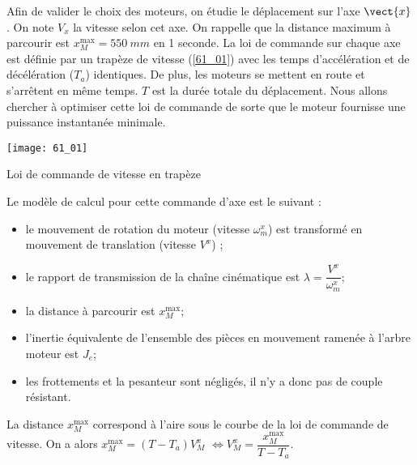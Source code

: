 \normaltrue
\correctionfalse


\setcounter{question}{0}%
\ifcorrection
\else
{}
\fi

\ifprof
\else
Afin de valider le choix des moteurs, on étudie le déplacement sur l’axe $\vect{x}$.%
On note $V_x$ la vitesse selon cet axe.
On rappelle que la distance maximum à parcourir est $x_M^{\text{max}} = \SI{550}{mm}$ en 1 seconde.
La loi de commande sur chaque axe est définie par un trapèze de vitesse (\autoref{61_01})
avec les temps d’accélération et de décélération ($T_a$) identiques. De plus, les moteurs se mettent en route et s’arrêtent en
même temps. $T$ est la durée totale du déplacement. Nous allons chercher à optimiser cette loi de commande de sorte
que le moteur fournisse une puissance instantanée minimale.

\begin{marginfigure}
\centering
\texttt{[image: 61\_01]}
\caption{\label{61_01} Loi de commande de vitesse en trapèze}
\end{marginfigure}

Le modèle de calcul pour cette commande d’axe est le suivant :
\begin{itemize}
\item le mouvement de rotation du moteur (vitesse $\omega_m^x$) est transformé en mouvement de translation (vitesse $V^x$) ;
\item le rapport de transmission de la chaîne cinématique est $\lambda = \dfrac{V^x}{\omega_m^x}$;
\item la distance à parcourir est $x_M^{\text{max}}$;
\item l’inertie équivalente de l’ensemble des pièces en mouvement ramenée à l’arbre moteur est $J_e$;
\item les frottements et la pesanteur sont négligés, il n’y a donc pas de couple résistant.
\end{itemize}
\fi
{}
\ifprof
La distance  $x_M^{\text{max}}$ correspond à l'aire sous le courbe de la loi de commande de vitesse.
On a alors 
 $x_M^{\text{max}} = \left(T-T_a\right)V_M^x$ 
 $ \Longleftrightarrow V_M^x=\dfrac{x_M^{\text{max}}}{T-T_a}$. 
\else
\fi

